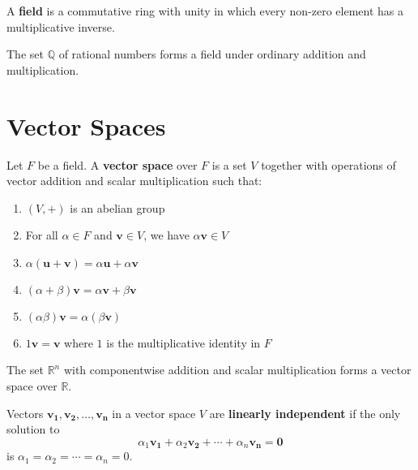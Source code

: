 \begin{definition}[Field]
A \textbf{field} is a commutative ring with unity in which every non-zero element has a multiplicative inverse.
\end{definition}

\begin{example}
The set $\mathbb{Q}$ of rational numbers forms a field under ordinary addition and multiplication.
\end{example}

\section{Vector Spaces}

\begin{definition}
Let $F$ be a field. A \textbf{vector space} over $F$ is a set $V$ together with operations of vector addition and scalar multiplication such that:
\begin{enumerate}
    \item $(V, +)$ is an abelian group
    \item For all $\alpha \in F$ and $\mathbf{v} \in V$, we have $\alpha \mathbf{v} \in V$
    \item $\alpha(\mathbf{u} + \mathbf{v}) = \alpha\mathbf{u} + \alpha\mathbf{v}$
    \item $(\alpha + \beta)\mathbf{v} = \alpha\mathbf{v} + \beta\mathbf{v}$
    \item $(\alpha\beta)\mathbf{v} = \alpha(\beta\mathbf{v})$
    \item $1\mathbf{v} = \mathbf{v}$ where $1$ is the multiplicative identity in $F$
\end{enumerate}
\end{definition}

\begin{example}
The set $\mathbb{R}^n$ with componentwise addition and scalar multiplication forms a vector space over $\mathbb{R}$.
\end{example}

\begin{definition}
Vectors $\mathbf{v_1}, \mathbf{v_2}, \ldots, \mathbf{v_n}$ in a vector space $V$ are \textbf{linearly independent} if the only solution to
\[\alpha_1 \mathbf{v_1} + \alpha_2 \mathbf{v_2} + \cdots + \alpha_n \mathbf{v_n} = \mathbf{0}\]
is $\alpha_1 = \alpha_2 = \cdots = \alpha_n = 0$.
\end{definition}

